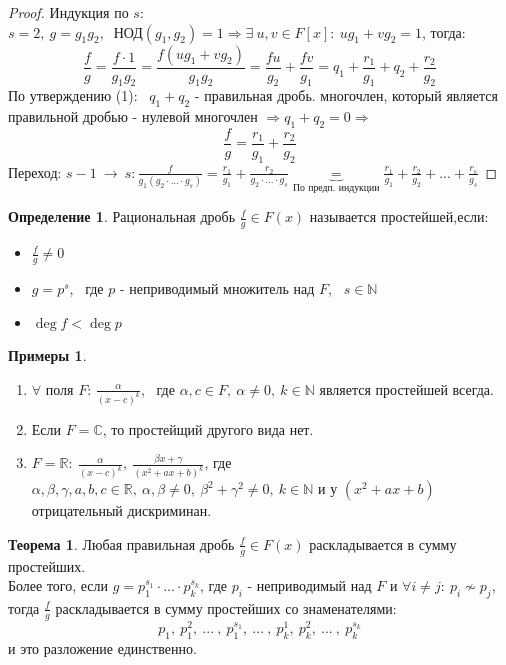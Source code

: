 \documentclass[a4paper, 12pt]{article}
\newcommand{\R}{\mathbb R}
\newcommand{\N}{\mathbb N}
\newcommand\tab[1][.5cm]{\hspace*{#1}}
\theoremstyle{definition}
\newtheorem*{definition}{Определение}
\newtheorem*{theorem}{Теорема}
\newtheorem*{example}{Примеры}
\begin{document}
  \begin{proof}
    Индукция по $s$:\\
    $s=2, \ g = g_1g_2, \ $ НОД$(g_1, g_2)=1 \Longrightarrow \exists \ u, v \in F[x]: \ ug_1 + vg_2 = 1$, тогда:
    $$\frac{f}{g} = \frac{f\cdot 1}{g_1g_2} = \frac{f(ug_1 + vg_2)}{g_1g_2} = \frac{fu}{g_2} + \frac{fv}{g_1} = q_1 + \frac{r_1}{g_1} + q_2 + \frac{r_2}{g_2}$$
    По утверждению (1): \ $q_1 + q_2$ - правильная дробь. многочлен, который является правильной дробью - нулевой многочлен  $\Longrightarrow q_1 + q_2 = 0 \Longrightarrow$ 
    $$\frac{f}{g} =\frac{r_1}{g_1} + \frac{r_2}{g_2}$$
    Переход: $s-1 \ \to \ s: \frac{f}{g_1(g_2\cdot ... \cdot g_s)} = \frac{r_1}{g_1} + \frac{r_2}{g_2\cdot ... \cdot g_s} \underbrace{=}_{\text{По предп. индукции}} \frac{r_1}{g_1} + \frac{r_2}{g_2} + ... + \frac{r_s}{g_s}$
  \end{proof}
  \begin{definition}
    Рациональная дробь $\frac{f}{g}\in F(x)$ называется простейшей,если:
    \begin{itemize}
      \item[1) \ ] $\frac{f}{g} \neq 0$
      \item[2) \ ] $g = p^s$, \ где $p$ - неприводимый множитель над $F$, \ $s \in \N$
      \item[3) \ ] $\deg f < \deg p$ 
    \end{itemize}
  \end{definition}
  \begin{example}\tab
    \begin{enumerate}
      \item $\forall$ поля $F$: $\frac{\alpha}{(x-c)^k}$, \ где $\alpha, c \in F, \ \alpha\neq 0, \ k \in \N$ является простейшей всегда.
      \item Если $F = \mathbb{C}$, то простейщий другого вида нет.
      \item $F = \R: \ \frac{\alpha}{(x-c)^k}, \ \frac{\beta x + \gamma}{(x^2+ax+b)^k}$, где $\alpha, \beta, \gamma, a, b, c \in \R, \ \alpha, \beta \neq 0, \ \beta^2 + \gamma^2\neq 0, \ k \in \N$ и у $(x^2+ax+b)$ отрицательный дискриминан.   
    \end{enumerate}
  \end{example}
  \begin{theorem}
    Любая правильная дробь $\frac{f}{g} \in F(x)$ раскладывается в сумму простейших.\\
    Более того, если $g = p_1^{s_1}\cdot ... \cdot p_k^{s_k}$, где $p_i$ - неприводимый над $F$ и $\forall i \neq j: \ p_i \not \sim p_j$, тогда $\frac{f}{g}$ раскладывается в сумму простейших со знаменателями: $$p_1, \  p_1^2, \ ... \ , \ p_1^{s_1}, \ ... \ , \ p_k^1, \ p_k^2, \ ... \ , \ p_k^{s_k}$$
    и это разложение единственно.       
  \end{theorem}
\end{document}
